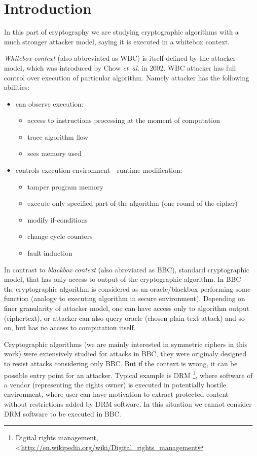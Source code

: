 \documentclass[11pt,oneside,final]{fithesis2}
\begin{document}
    \section{Introduction}    
    In this part of cryptography we are studying cryptographic algorithms with a much stronger attacker model, saying it is executed in a 
    whitebox context. 

    \emph{Whitebox context} (also abbreviated as WBC) is itself defined by the attacker model, which was introduced by Chow \emph{et~al.} \citep{Chow02white-boxcryptography} in 2002.
    WBC attacker has full control over execution of particular 
    algorithm. Namely attacker has the following abilities:
    
    \begin{itemize}
	\item can observe execution:
	\begin{itemize}
	    \item access to instructions processing at the moment of computation
	    \item trace algorithm flow
	    \item sees memory used
	\end{itemize}
	\item controls execution environment - runtime modification:
	\begin{itemize}
	    \item tamper program memory
	    \item execute only specified part of the algorithm (one round of the cipher)
	    \item modify if-conditions
	    \item change cycle counters
	    \item fault induction
	\end{itemize}
    \end{itemize}
    
    In contrast to \emph{blackbox context} (also abreviated as BBC), standard cryptographic model, that has only access to output of the cryptographic algorithm. In BBC the cryptographic algorithm is
    considered as an oracle/blackbox performing some function (analogy to executing algorithm in secure environment).
    Depending on finer granularity of attacker model, one can have 
    access only to algorithm output (ciphertext), or attacker can also query oracle (chosen plain-text attack) and so on, but has no access to computation itself.

    Cryptographic algorithms (we are mainly interested in symmetric ciphers in this work) were extensively studied for attacks in BBC, 
    they were originaly designed to resist attacks considering only BBC. But if the context is wrong, it can be possible entry point for an attacker.
    Typical example is DRM \footnote{Digital rights management, \textless\url{http://en.wikipedia.org/wiki/Digital_rights_management}}, where software of a vendor
    (representing the rights owner) is executed in potentially hostile environment, where user can have motivation to extract protected content without
    restrictions added by DRM software. In this situation we cannot consider DRM software to be executed in BBC.
    
\end{document}
